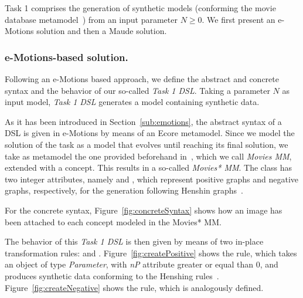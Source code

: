 
Task 1 comprises the generation of synthetic models (conforming the movie database metamodel~\cite{imdbcase}) from an input parameter $N \geq 0$. We first present an e-Motions solution and then a Maude solution. 


\subsubsection{e-Motions-based solution.}

Following an e-Motions based approach, we define the abstract and concrete syntax and the behavior of our so-called \textit{Task 1 DSL}. Taking a parameter $N$ as input model, \textit{Task 1 DSL} generates a model containing synthetic data.

As it has been introduced in Section~\ref{sub:emotions}, the abstract syntax of a DSL is given in e-Motions by means of an Ecore metamodel. Since we model the solution of the task as a model that evolves until reaching its final solution, we take as metamodel the one provided beforehand in~\cite{imdbsources}, which we call \textit{Movies MM}, extended with a  concept. This results in a so-called \textit{Movies* MM}. The class  has two integer attributes, namely  and , which represent positive graphs and negative graphs, respectively, for the generation following Henshin graphs~\cite{henshing}.

For the concrete syntax, Figure~\ref{fig:concreteSyntax} shows how an image has been attached to each concept modeled in the Movies* MM. 

The behavior of this \textit{Task 1 DSL} is then given by means of two in-place transformation rules:  and . Figure~\ref{fig:createPositive} shows the  rule, which takes an object  of type \textit{Parameter}, with \textit{nP} attribute greater or equal than $0$, and produces synthetic data conforming to the Henshing rules~\cite{henshing}. Figure~\ref{fig:createNegative} shows the  rule, which is analogously defined.


